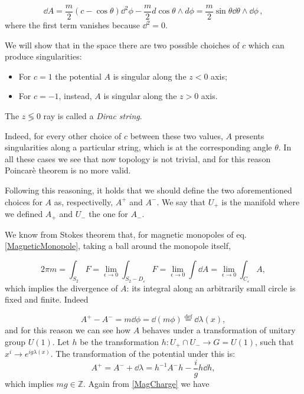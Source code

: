 \documentclass[main.tex]{subfiles}
\begin{document}
\begin{equation}
\dd{A}=\frac{m}{2}\left(c-\cos\theta\right)\dd^2\phi-\frac{m}{2}d\cos\theta\wedge d \phi=\frac{m}{2}\sin\theta \dd{\theta}\wedge \dd{\phi}\,,
\end{equation}
where the first term vanishes because \(\dd^2 = 0\).

We will show that in the space there are two possible choiches of $c$ which can produce singularities:

\begin{itemize}
\item For $c=1$ the potential \(A\) is singular along the \(z<0\) axis;
\item For $c=-1$, instead, \(A\) is singular along the \(z>0\) axis.
\end{itemize}

The \(z \lessgtr 0\) ray is called a \emph{Dirac string}.

Indeed, for every other choice of $c$ between these two values, $A$ presents singularities along a particular string, which is at the corresponding angle $\theta$.
In all these cases we see that now topology is not trivial, and for this reason Poincarè theorem is no more valid.

Following this reasoning, it holds that we should define the two aforementioned choices for $A$ as, respectivelly, $A^+$ and $A^-$. We say that $U_+$ is the manifold where we defined $A_+$ and $U_-$ the one for $A_-$.

We know from Stokes theorem that, for magnetic monopoles of eq. \eqref{MagneticMonopole}, taking a ball around the monopole itself,

\begin{equation}\label{MagCharge}
2\pi m=\int_{S_2} F=\lim_{\epsilon\to 0}\int_{S_2-D_{\varepsilon}}F=\lim_{\epsilon\to 0}\int \dd{A}=\lim_{\epsilon\to 0}\int_{C_{\varepsilon}} A,
\end{equation}
which implies the divergence of $A$: its integral along an arbitrarily small circle is fixed and finite.
Indeed

\begin{equation}
A^+-A^-=m\dd{\phi}=\dd{(m\phi)} \overset{\text{def}}{=} \dd{\lambda(x)},
\end{equation}
%
and for this reason we can see how $A$ behaves under a transformation of unitary group $U(1)$.
Let $h$ be the transformation $h:U_+\cap U_- \to G=U(1)$, such that $x^i\to e^{ig\lambda(x)}$.
The transformation of the potential under this is:
%
\begin{equation}
A^+=A^-+\dd{\lambda}=h^{-1}A^-h-\frac{i}{g}h \dd{h},
\end{equation}
%
which implies $mg\in \mathbb{Z}$. Again from \eqref{MagCharge} we have
\end{document}

